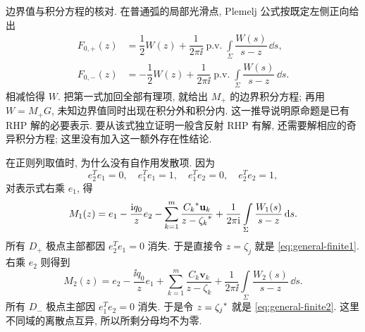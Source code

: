 \par\smallskip\noindent 边界值与积分方程的核对.\quad
在普通弧的局部光滑点, Plemelj 公式按既定左侧正向给出
\begin{equation*}
\begin{aligned}
F_{0,+}(z)
&=\dfrac{1}{2}W(z)
+\dfrac{1}{2\pi\ii}\operatorname{p.v.}
\int\limits_\Sigma\dfrac{W(s)}{s-z}\,\dd s,\\
F_{0,-}(z)
&=-\dfrac{1}{2}W(z)
+\dfrac{1}{2\pi\ii}\operatorname{p.v.}
\int\limits_\Sigma\dfrac{W(s)}{s-z}\,\dd s.
\end{aligned}
\end{equation*}
相减恰得 $W$.
把第一式加回全部有理项, 就给出 $M_+$ 的边界积分方程;
再用 $W=M_+G$, 未知边界值同时出现在积分外和积分内.
这一推导说明原命题是已有 RHP 解的必要表示.
要从该式独立证明一般含反射 RHP 有解, 还需要解相应的奇异积分方程;
这里没有加入这一额外存在性结论.

\par\smallskip\noindent 在正则列取值时, 为什么没有自作用发散项.\quad
因为
\begin{equation*}
e_2^Te_1=0,\quad e_1^Te_1=1,\quad
e_1^Te_2=0,\quad e_2^Te_2=1,
\end{equation*}
对表示式右乘 $e_1$, 得
\begin{equation*}
M_1(z)=e_1-\dfrac{\mathrm{i} q_0}{z}e_2
-\sum\limits_{k=1}^{m}
\dfrac{{C_k}^{*}\mathbf u_k}{z-{\zeta_k}^{*}}
+\dfrac{1}{2\pi\mathrm{i}}\int\limits_\Sigma
\dfrac{W_1(s)}{s-z}\,\mathrm{d} s.
\end{equation*}
所有 $D_+$ 极点主部都因 $e_2^Te_1=0$ 消失.
于是直接令 $z=\zeta_j$ 就是 \eqref{eq:general-finite1}.
右乘 $e_2$ 则得到
\begin{equation*}
M_2(z)=e_2-\dfrac{\ii q_0}{z}e_1
+\sum\limits_{k=1}^{m}
\dfrac{C_k\mathbf v_k}{z-\zeta_k}
+\dfrac{1}{2\pi\ii}\int\limits_\Sigma
\dfrac{W_2(s)}{s-z}\,\dd s.
\end{equation*}
所有 $D_-$ 极点主部因 $e_1^Te_2=0$ 消失.
于是令 $z={\zeta_j}^{*}$ 就是 \eqref{eq:general-finite2}.
这里不同域的离散点互异, 所以所剩分母均不为零.

